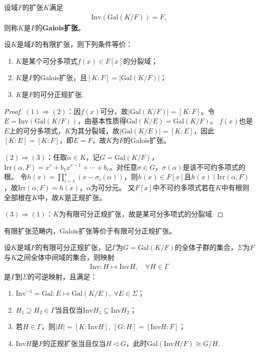 \documentclass[../../main.tex]{subfiles}%
\begin{document}
\begin{definition}
设域$F$的扩张$K$满足
\begin{align*}
\mathrm{Inv}(\mathrm{Gal}(K/F))=F,
\end{align*}
则称$K$是$F$的\textbf{Galois扩张}。
\end{definition}

\begin{theorem}
设$K$是域$F$的有限扩张，则下列条件等价：
\begin{enumerate}[(1)]
\item $K$是某个可分多项式$f(x)\in F[x]$的分裂域；
\item $K$是$F$的Galois扩张，且$[K:F]=|\mathrm{Gal}(K/F)|$；
\item $K$是$F$的可分正规扩张.
\end{enumerate}
\end{theorem}

\begin{proof}
$(1)\Rightarrow(2)$：因$f(x)$可分，故$|\mathrm{Gal}(K/F)|=[K:F]$。令$E=\mathrm{Inv}(\mathrm{Gal}(K/F))$，由基本性质得$\mathrm{Gal}(K/E)=\mathrm{Gal}(K/F)$。
$f(x)$也是$E$上的可分多项式，$K$为其分裂域，故$|\mathrm{Gal}(K/E)|=[K:E]$，因此$[K:E]=[K:F]$，即$E=F$，故$K$为$F$的Galois扩张。

$(2)\Rightarrow(3)$：任取$\alpha\in K$，记$G=\mathrm{Gal}(K/F)$，$\mathrm{Irr}(\alpha,F)=x^r+b_1x^{r-1}+\cdots+b_r$。对任意$\sigma\in G$，$\sigma(\alpha)$是该不可约多项式的根。
令$h(x)=\prod\limits_{i=1}^s(x-\sigma_i(\alpha))$，则$h(x)\in F[x]$且$h(x)\mid\mathrm{Irr}(\alpha,F)$，故$\mathrm{Irr}(\alpha,F)=h(x)$，$\alpha$为可分元。
又$F[x]$中不可约多项式若在$K$中有根则全部根在$K$中，故$K$是正规扩张。

$(3)\Rightarrow(1)$：$K$为有限可分正规扩张，故是某可分多项式的分裂域.
\end{proof}

\begin{remark}
有限扩张范畴内，Galois扩张等价于有限可分正规扩张。
\end{remark}

\begin{theorem}
设$K$是域$F$的有限可分正规扩张，记$\Gamma$为$G=\mathrm{Gal}(K/F)$的全体子群的集合，$\Sigma$为$F$与$K$之间全体中间域的集合，则映射
\begin{align*}
\mathrm{Inv}:H\mapsto\mathrm{Inv}H,\quad \forall H\in\Gamma
\end{align*}
是$\Gamma$到$\Sigma$的可逆映射，且满足：
\begin{enumerate}[(1)]
\item $\mathrm{Inv}^{-1}=\mathrm{Gal}:E\mapsto\mathrm{Gal}(K/E),\ \forall E\in\Sigma$；
\item $H_1\supseteq H_2\in\Gamma$当且仅当$\mathrm{Inv}H_1\subseteq\mathrm{Inv}H_2$；
\item 若$H\in\Gamma$，则$|H|=[K:\mathrm{Inv}H],\ [G:H]=[\mathrm{Inv}H:F]$；
\item $\mathrm{Inv}H$是$F$的正规扩张当且仅当$H\lhd G$，此时$\mathrm{Gal}(\mathrm{Inv}H/F)\cong G/H$.
\end{enumerate}
\end{theorem}
\end{document}
